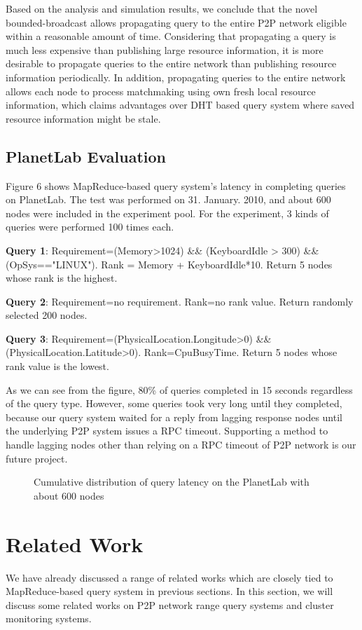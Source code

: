 \documentclass{acm_proc_article-sp}
\begin{document}
Based on the analysis and simulation results, we conclude that the novel bounded-broadcast allows propagating query to the entire P2P network eligible within a reasonable amount of time.
Considering that propagating a query is much less expensive than publishing large resource information, it is more desirable to propagate queries to the entire network than publishing resource information periodically. 
In addition, propagating queries to the entire network allows each node to process matchmaking using own fresh local resource information, 
which claims advantages over DHT based query system where saved resource information might be stale.

\subsection{PlanetLab Evaluation}
Figure 6 shows MapReduce-based query system's latency in completing queries on PlanetLab. The test was performed on 31. January. 2010, and about 600 nodes were included in the experiment pool.
For the experiment, 3 kinds of queries were performed 100 times each. 

\textbf{Query 1}: Requirement=(Memory>1024) \&\& (KeyboardIdle > 300) \&\& (OpSys=="LINUX"). Rank = Memory + KeyboardIdle*10. Return 5 nodes whose rank is the highest.

\textbf{Query 2}: Requirement=no requirement. Rank=no rank value. Return randomly selected 200 nodes. 

\textbf{Query 3}: Requirement=(PhysicalLocation.Longitude>0) \&\& (PhysicalLocation.Latitude>0). Rank=CpuBusyTime. Return 5 nodes whose rank value is the lowest.

As we can see from the figure, 80\% of queries completed in 15 seconds regardless of the query type. However, some queries took very long until they completed, 
because our query system waited for a reply from lagging response nodes until the underlying P2P system issues a RPC timeout.
Supporting a method to handle lagging nodes other than relying on a RPC timeout of P2P network is our future project.
\begin{figure}
\centering
{}
\caption{Cumulative distribution of query latency on the PlanetLab with about 600 nodes}
\end{figure}
\section{Related Work}
We have already discussed a range of related works which are closely tied to MapReduce-based query system in previous sections. 
In this section, we will discuss some related works on P2P network range query systems and cluster monitoring systems.
\end{document}
